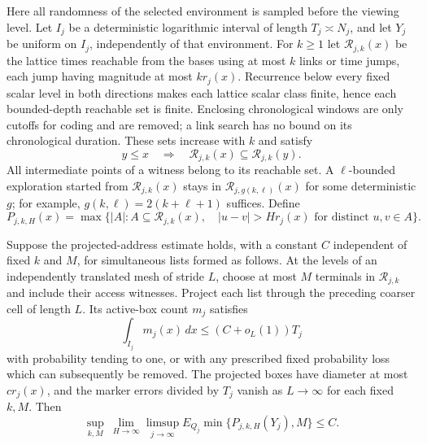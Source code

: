 Here all randomness of the selected environment is sampled before the
viewing level.  Let $I_j$ be a deterministic logarithmic interval of length
$T_j\asymp N_j$, and let $Y_j$ be uniform on $I_j$, independently of that
environment.  For $k\ge1$ let $\mathcal R_{j,k}(x)$ be the lattice times
reachable from the bases using at most $k$ links or time jumps, each jump
having magnitude at most $kr_j(x)$.  Recurrence below every fixed scalar
level in both directions makes each lattice scalar class finite, hence
each bounded-depth reachable set is finite.  Enclosing chronological
windows are only cutoffs for coding and are removed; a link search has
no bound on its chronological duration.  These sets increase with $k$
and satisfy
\begin{equation}\label{view:reach-monotonicity}
 y\le x\quad\Longrightarrow\quad
 \mathcal R_{j,k}(x)\subseteq\mathcal R_{j,k}(y).
\end{equation}
All intermediate points of a witness belong to its reachable set.  A
$\ell$-bounded exploration started from $\mathcal R_{j,k}(x)$ stays in
$\mathcal R_{j,g(k,\ell)}(x)$ for some deterministic $g$; for example,
$g(k,\ell)=2(k+\ell+1)$ suffices.  Define
\[
 P_{j,k,H}(x)=\max\{|A|:A\subseteq\mathcal R_{j,k}(x),\quad
 |u-v|>Hr_j(x)\text{ for distinct }u,v\in A\}.
\]

\begin{lemma}
\label{view:occupation-packing}
Suppose the projected-address estimate holds, with a constant $C$
independent of fixed $k$ and $M$, for simultaneous lists formed as follows.
At the levels of an independently translated mesh of stride $L$, choose
at most $M$ terminals in $\mathcal R_{j,k}$ and include their access
witnesses.  Project each list through the preceding coarser cell of length
$L$.  Its active-box count $m_j$ satisfies
\[
 \int_{I_j}m_j(x)\,dx\le(C+o_L(1))T_j
\]
with probability tending to one, or with any prescribed fixed probability
loss which can subsequently be removed.  The projected boxes have diameter
at most $cr_j(x)$, and the marker errors divided by $T_j$ vanish as
$L\to\infty$ for each fixed $k,M$.  Then
\begin{equation}\label{view:packing-bound}
 \sup_{k,M}\ \lim_{H\to\infty}\limsup_{j\to\infty}
 E_{Q_j}\min\{P_{j,k,H}(Y_j),M\}\le C.
\end{equation}
\end{lemma}

